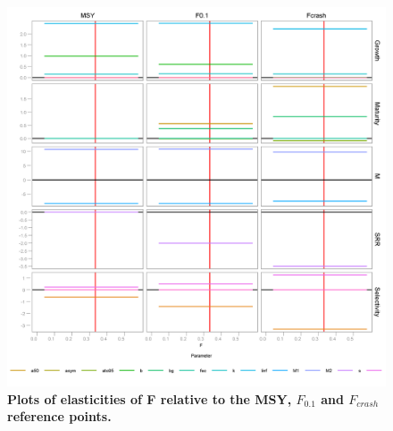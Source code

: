\documentclass{pnastwo}
\begin{document}
\begin{figure}[ht]
\begin{center}
\centerline{\includegraphics[width=.7\textwidth]{fig5.png}}
\end{center}
\caption{\bf{Plots of elasticities of F relative to the MSY, $F_{0.1}$ and $F_{crash}$ reference points.}}
\label{fig:elasf}
\end{figure}
\end{document}
